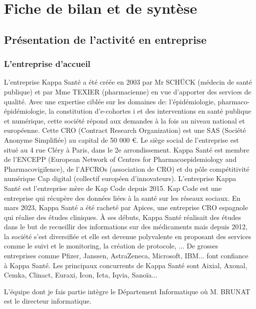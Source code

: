 \section{Fiche de bilan et de syntèse}
\subsection{Présentation de l'activité en entreprise}
\subsubsection{L'entreprise d'accueil}
L’entreprise Kappa Santé a été créée en 2003 par Mr SCHÜCK (médecin de
santé publique) et par Mme TEXIER (pharmacienne) en vue d’apporter des
services de qualité. Avec une expertise ciblée sur les domaines de:
l’épidémiologie, pharmaco- épidémiologie, la constitution d’e-cohortes i et des
interventions en santé publique et numérique, cette société répond aux
demandes à la fois au niveau national et européenne.
Cette CRO (Contract Research Organization) est une SAS (Société Anonyme
Simplifiée) au capital de 50 000 €.
Le siège social de l’entreprise est situé au 4 rue Cléry à Paris, dans le 2e
arrondissement.
Kappa Santé est membre de l’ENCEPP (European Network of Centres for
Pharmacoepidemiology and Pharmacovigilence), de l’AFCROs (association de
CRO) et du pôle compétitivité numérique Cap digital (collectif européen
d’innovateurs).
L’entreprise Kappa Santé est l’entreprise mère de Kap Code depuis 2015. Kap
Code est une entreprise qui récupère des données liées à la santé sur les
réseaux sociaux.
En mars 2023, Kappa Santé a été racheté par Apices, une entreprise CRO
espagnole qui réalise des études cliniques.
À ses débuts, Kappa Santé réalisait des études dans le but de recueillir des
informations sur des médicaments mais depuis 2012, la société s’est diversifiée
et elle est devenue polyvalente en proposant des services comme le suivi et le
monitoring, la création de protocole, ...
De grosses entreprises comme Pfizer, Janssen, AstraZeneca, Microsoft, IBM... font confiance à Kappa Santé. Les principaux concurrents de Kappa Santé sont
Aixial, Axonal, Cemka, Clinact, Euraxi, Icon, Icta, Iqvia, Sanoïa...

L’équipe dont je fais partie intègre le Département Informatique où M. BRUNAT est le directeur informatique.

